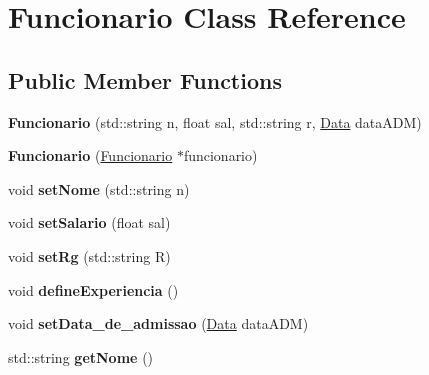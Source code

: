 \hypertarget{classFuncionario}{}\section{Funcionario Class Reference}
\label{classFuncionario}
\subsection*{Public Member Functions}
\begin{DoxyCompactItemize}
\item 
\mbox{\label{classFuncionario_a2b3beb26cda8272a3527db2c47e54b24}} 
{\bfseries Funcionario} (std\+::string n, float sal, std\+::string r, \hyperlink{classData}{Data} data\+A\+DM)
\item 
\mbox{\label{classFuncionario_a28a2edab6767b999b82c2b9cc2d0792a}} 
{\bfseries Funcionario} (\hyperlink{classFuncionario}{Funcionario} $\ast$funcionario)
\item 
\mbox{\label{classFuncionario_a55b85a7cc3ccd31efe3d853ecd5fc73b}} 
void {\bfseries set\+Nome} (std\+::string n)
\item 
\mbox{\label{classFuncionario_a55f8c48cf5b0fc27ce4982d5cd93f289}} 
void {\bfseries set\+Salario} (float sal)
\item 
\mbox{\label{classFuncionario_aa754ebbf1518f3e93a38edddf1061765}} 
void {\bfseries set\+Rg} (std\+::string R)
\item 
\mbox{\label{classFuncionario_a9ba762334350713751b0886ebf6cadcf}} 
void {\bfseries define\+Experiencia} ()
\item 
\mbox{\label{classFuncionario_a807111866a8e1e13246b88d09bb9f2d6}} 
void {\bfseries set\+Data\+\_\+de\+\_\+admissao} (\hyperlink{classData}{Data} data\+A\+DM)
\item 
\mbox{\label{classFuncionario_a35376709ae5c7357e79ca612a74e7f15}} 
std\+::string {\bfseries get\+Nome} ()
\item 
\mbox{\label{classFuncionario_a98d5aef3daa877847e45e6ff34c7dcf8}} 

\end{DoxyCompactItemize}
